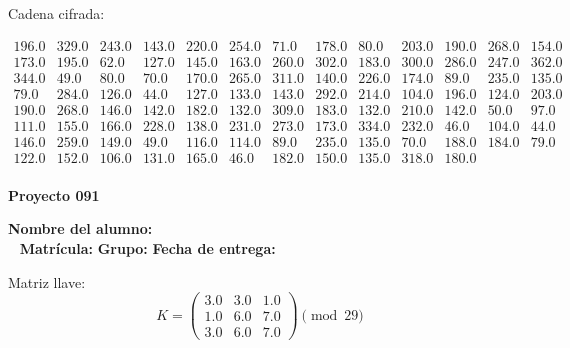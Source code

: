 \documentclass[12pt]{article}
\begin{document}
Cadena cifrada:
\begin{center}
$\begin{array}{lllllllllllll}
196.0 & 329.0 & 243.0 & 143.0 & 220.0 & 254.0 & 71.0 & 178.0 & 80.0 & 203.0 & 190.0 & 268.0 & 154.0\\
173.0 & 195.0 & 62.0 & 127.0 & 145.0 & 163.0 & 260.0 & 302.0 & 183.0 & 300.0 & 286.0 & 247.0 & 362.0\\
344.0 & 49.0 & 80.0 & 70.0 & 170.0 & 265.0 & 311.0 & 140.0 & 226.0 & 174.0 & 89.0 & 235.0 & 135.0\\
79.0 & 284.0 & 126.0 & 44.0 & 127.0 & 133.0 & 143.0 & 292.0 & 214.0 & 104.0 & 196.0 & 124.0 & 203.0\\
190.0 & 268.0 & 146.0 & 142.0 & 182.0 & 132.0 & 309.0 & 183.0 & 132.0 & 210.0 & 142.0 & 50.0 & 97.0\\
111.0 & 155.0 & 166.0 & 228.0 & 138.0 & 231.0 & 273.0 & 173.0 & 334.0 & 232.0 & 46.0 & 104.0 & 44.0\\
146.0 & 259.0 & 149.0 & 49.0 & 116.0 & 114.0 & 89.0 & 235.0 & 135.0 & 70.0 & 188.0 & 184.0 & 79.0\\
122.0 & 152.0 & 106.0 & 131.0 & 165.0 & 46.0 & 182.0 & 150.0 & 135.0 & 318.0 & 180.0\\
\end{array}$
\end{center}

\newpage


\textbf{Proyecto 091}

\textbf{Nombre del alumno:} \underline{\hspace{13cm}}\\\
\vspace{1cm}
\textbf{Matrícula:} \underline{\hspace{4cm}} \hspace{1cm}
\textbf{Grupo:} \underline{\hspace{2cm}}
\textbf{Fecha de entrega:} \underline{\hspace{2cm}}

\medskip

Matriz llave:
\[
K = \begin{pmatrix}
3.0 & 3.0 & 1.0\\
1.0 & 6.0 & 7.0\\
3.0 & 6.0 & 7.0
\end{pmatrix} \pmod{29}
\]
\end{document}
